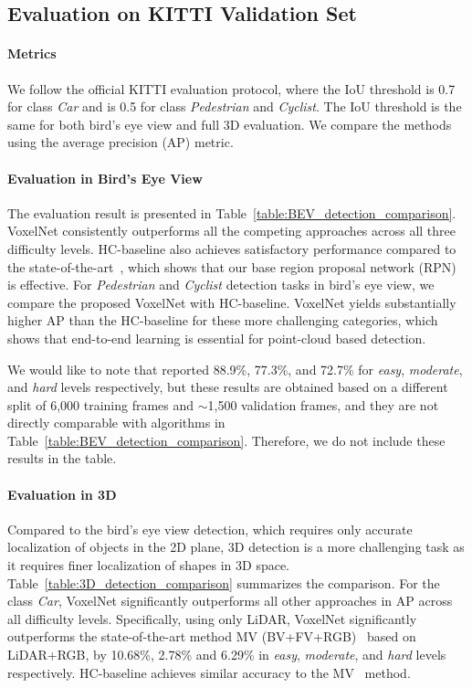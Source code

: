 \documentclass[10pt,twocolumn,letterpaper]{article}
\begin{document}
\subsection{Evaluation on KITTI Validation Set}
\paragraph{Metrics} 
We follow the official KITTI evaluation protocol, where the IoU threshold is 0.7 for class \textit{Car} and is 0.5 for class \textit{Pedestrian} and \textit{Cyclist}. The IoU threshold is the same for both bird's eye view and full 3D evaluation. We compare the methods using the average precision (AP) metric.



\paragraph{Evaluation in Bird's Eye View} 

The evaluation result is presented in Table~\ref{table:BEV_detection_comparison}. VoxelNet consistently outperforms all the competing approaches across all three difficulty levels. HC-baseline also achieves satisfactory performance compared to the state-of-the-art~\cite{REF:cvpr17chen}, which shows that our base region proposal network (RPN) is effective. For \textit{Pedestrian} and \textit{Cyclist} detection tasks in bird's eye view, we compare the proposed VoxelNet with HC-baseline. VoxelNet yields substantially higher AP than the HC-baseline for these more challenging categories, which shows that end-to-end learning is essential for point-cloud based detection.

We would like to note that \cite{REF:3DFCN} reported 88.9\%, 77.3\%, and 72.7\% for \textit{easy}, \textit{moderate}, and \textit{hard} levels respectively, but these results are obtained based on a different split of 6,000 training frames and $\sim$1,500 validation frames, and they are not directly comparable with algorithms in Table~\ref{table:BEV_detection_comparison}. Therefore, we do not include these results in the table.


\paragraph{Evaluation in 3D}
Compared to the bird's eye view detection, which requires only accurate localization of objects in the 2D plane, 3D detection is a more challenging task as it requires finer localization of shapes in 3D space. Table~\ref{table:3D_detection_comparison} summarizes the  comparison. For the class \textit{Car}, VoxelNet significantly outperforms all other approaches in AP across all difficulty levels. Specifically, using only LiDAR, VoxelNet significantly outperforms the state-of-the-art method MV (BV+FV+RGB)~\cite{REF:cvpr17chen} based on LiDAR+RGB, by 10.68\%, 2.78\% and 6.29\% in \textit{easy}, \textit{moderate}, and \textit{hard} levels respectively. HC-baseline achieves similar accuracy to the MV~\cite{REF:cvpr17chen} method.
\end{document}
